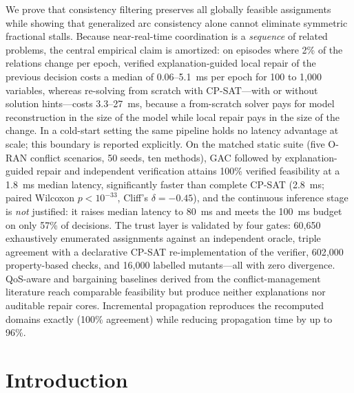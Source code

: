 \documentclass[pdflatex,sn-mathphys-num,iicol,oneside]{sn-jnl}
\begin{document}
{We prove that consistency filtering preserves all globally feasible
assignments while showing that generalized arc consistency alone
cannot eliminate symmetric fractional stalls. Because near-real-time
coordination is a \emph{sequence} of related problems, the central
empirical claim is amortized: on episodes where 2\% of the relations
change per epoch, verified explanation-guided local repair of the
previous decision costs a median of 0.06--5.1~ms per epoch for 100 to
1{,}000 variables, whereas re-solving from scratch with CP-SAT---with
or without solution hints---costs 3.3--27~ms, because a from-scratch
solver pays for model reconstruction in the size of the model while
local repair pays in the size of the change. In a cold-start setting
the same pipeline holds no latency advantage at scale; this boundary is
reported explicitly. On the matched static suite (five O-RAN conflict
scenarios, 50 seeds, ten methods), GAC followed by explanation-guided
repair and independent verification attains 100\% verified feasibility
at a 1.8~ms median latency, significantly faster than complete CP-SAT
(2.8~ms; paired Wilcoxon $p<10^{-33}$, Cliff's $\delta=-0.45$), and the
continuous inference stage is \emph{not} justified: it raises median
latency to 80~ms and meets the 100~ms budget on only 57\% of decisions.
The trust layer is validated by four gates: 60{,}650 exhaustively
enumerated assignments against an independent oracle, triple agreement
with a declarative CP-SAT re-implementation of the verifier, 602{,}000
property-based checks, and 16{,}000 labelled mutants---all with zero
divergence. QoS-aware and bargaining baselines derived from the
conflict-management literature reach comparable feasibility but produce
neither explanations nor auditable repair cores. Incremental
propagation reproduces the recomputed domains exactly (100\% agreement)
while reducing propagation time by up to 96\%.
}


\maketitle

\section{Introduction}
\label{sec:introduction}
\end{document}
